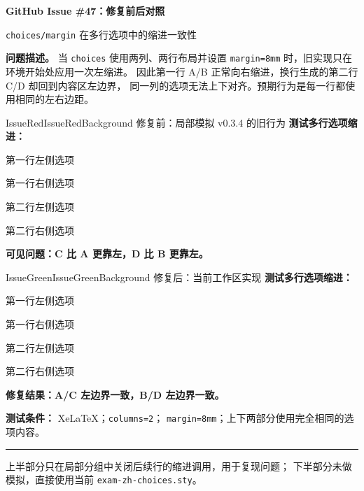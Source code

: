 \documentclass{exam-zh}
\newcommand\samechoicesexample{%
  \noindent\textbf{测试多行选项缩进：}
  \begin{choices}
    \item 第一行左侧选项
    \item 第一行右侧选项
    \item 第二行左侧选项
    \item 第二行右侧选项
  \end{choices}%
}
\begin{document}
\color{IssueInk}

\begin{center}
  {\LARGE\bfseries GitHub Issue \#47：修复前后对照}\par
  \vspace{1mm}
  {\large \texttt{choices/margin} 在多行选项中的缩进一致性}
\end{center}

\vspace{3mm}

\noindent
\textbf{问题描述。}
当 \texttt{choices} 使用两列、两行布局并设置
\texttt{margin=8mm} 时，旧实现只在环境开始处应用一次左缩进。
因此第一行 A/B 正常向右缩进，换行生成的第二行 C/D 却回到内容区左边界，
同一列的选项无法上下对齐。预期行为是每一行都使用相同的左右边距。

\begingroup
  \UseIssueFortySevenOldBehavior
  \begin{issuepanel}{IssueRed}{IssueRedBackground}
    {修复前：局部模拟 v0.3.4 的旧行为}
    \samechoicesexample
    \par\smallskip
    \noindent\color{IssueRed}\bfseries
    可见问题：C 比 A 更靠左，D 比 B 更靠左。
  \end{issuepanel}
\endgroup

\begin{issuepanel}{IssueGreen}{IssueGreenBackground}
  {修复后：当前工作区实现}
  \samechoicesexample
  \par\smallskip
  \noindent\color{IssueGreen}\bfseries
  修复结果：A/C 左边界一致，B/D 左边界一致。
\end{issuepanel}

\noindent
\textcolor{IssueMuted}{\textbf{测试条件：}}
\textcolor{IssueMuted}{XeLaTeX；\texttt{columns=2}；
\texttt{margin=8mm}；上下两部分使用完全相同的选项内容。}

\vfill
\noindent\textcolor{IssueRule}{\rule{\linewidth}{0.4pt}}
\par\smallskip
\noindent\footnotesize\color{IssueMuted}
上半部分只在局部分组中关闭后续行的缩进调用，用于复现问题；
下半部分未做模拟，直接使用当前 \texttt{exam-zh-choices.sty}。
\end{document}
